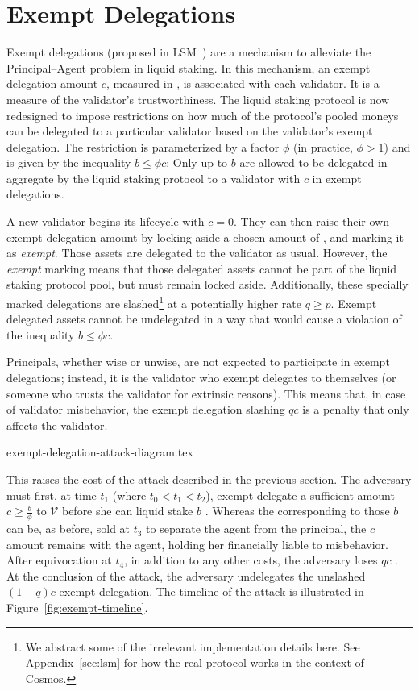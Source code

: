 \section{Exempt Delegations}

Exempt delegations (proposed in LSM~\cite{liquidity-staking-module})
are a mechanism to alleviate the Principal--Agent problem in liquid staking.
In this mechanism, an exempt delegation amount $c$, measured in \asset, is associated
with each validator. It is a measure of the validator's trustworthiness.
The liquid staking protocol is now redesigned to impose restrictions
on how much of the protocol's pooled moneys can be delegated to a particular
validator based on the validator's exempt delegation.
The restriction is
parameterized by a factor $\phi$ (in practice, $\phi > 1$)
and is given by the inequality $b \leq \phi c$: Only up to $b$ \assets
are allowed to be delegated in aggregate by the liquid staking protocol
to a validator with $c$ \assets in exempt delegations.

A new validator begins its lifecycle with $c = 0$. They can then
raise their own exempt delegation amount by locking aside a
chosen amount of \asset, and marking it as \emph{exempt}. Those
assets are delegated to the validator as usual. However,
the \emph{exempt}
marking means that those delegated assets cannot be part of the liquid
staking protocol pool, but must remain locked aside. Additionally,
these specially marked delegations are slashed\footnote{We abstract some
of the irrelevant implementation details here. See Appendix~\ref{sec:lsm}
for how the real protocol works in the context of Cosmos.}
at a potentially higher rate $q \geq p$. Exempt delegated assets cannot
be undelegated in a way that would cause a violation of the inequality
$b \leq \phi c$.

Principals, whether wise or unwise, are not expected to participate in exempt
delegations; instead, it is the validator who exempt delegates to
themselves (or someone who trusts the validator for extrinsic reasons).
This means that, in case of validator misbehavior, the exempt delegation
slashing $qc$ is a penalty that only affects the validator.

{exempt-delegation-attack-diagram.tex}

This raises
the cost of the attack described in the previous section. The
adversary must first, at time $t_1$ (where $t_0 < t_1 < t_2$), exempt delegate a sufficient amount
$c \geq \frac{b}{\phi}$ \asset to $\mathcal{V}$ before she can liquid stake $b$ \asset.
Whereas the \stassets
corresponding to those $b$ \assets can be, as before, sold at $t_3$ to
separate the agent from the principal, the $c$ amount remains with the
agent, holding her financially liable to misbehavior. After equivocation at $t_4$,
in addition to any other costs, the adversary loses $qc$ \asset. At the conclusion
of the attack, the adversary undelegates the unslashed $(1 - q)c$ \asset exempt delegation.
The timeline of the attack is illustrated in Figure~\ref{fig:exempt-timeline}.

